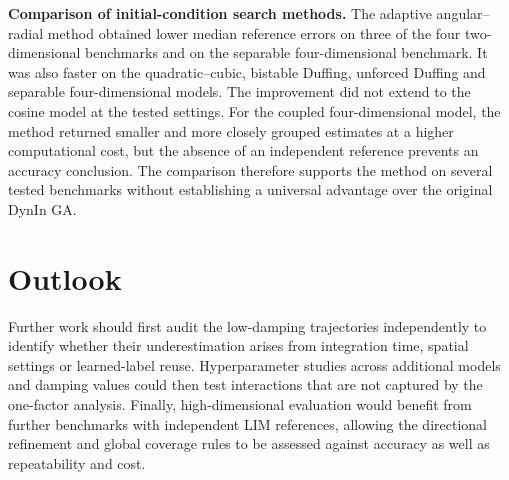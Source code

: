 \begin{greenrevision}
\textbf{Comparison of initial-condition search methods.}
The adaptive angular--radial method obtained lower median reference errors on three of the four two-dimensional benchmarks and on the separable four-dimensional benchmark. It was also faster on the quadratic--cubic, bistable Duffing, unforced Duffing and separable four-dimensional models. The improvement did not extend to the cosine model at the tested settings. For the coupled four-dimensional model, the method returned smaller and more closely grouped estimates at a higher computational cost, but the absence of an independent reference prevents an accuracy conclusion. The comparison therefore supports the method on several tested benchmarks without establishing a universal advantage over the original DynIn GA.
\end{greenrevision}

\section{Outlook}

\begin{greenrevision}
Further work should first audit the low-damping trajectories independently to identify whether their underestimation arises from integration time, spatial settings or learned-label reuse. Hyperparameter studies across additional models and damping values could then test interactions that are not captured by the one-factor analysis. Finally, high-dimensional evaluation would benefit from further benchmarks with independent LIM references, allowing the directional refinement and global coverage rules to be assessed against accuracy as well as repeatability and cost.
\end{greenrevision}

